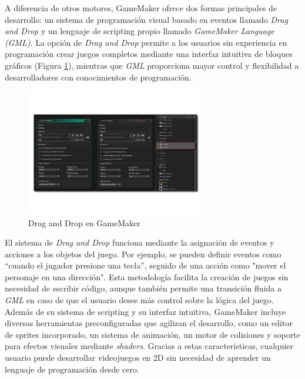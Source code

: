 A diferencia de otros motores, GameMaker ofrece dos formas principales de desarrollo: un sistema de programación visual basado en eventos llamado \textit{Drag and Drop} y un lenguaje de scripting propio llamado \textit{GameMaker Language (GML)}. La opción de \textit{Drag and Drop} permite a los usuarios sin experiencia en programación crear juegos completos mediante una interfaz intuitiva de bloques gráficos (Figura \ref{fig:GameMaker_Figure}), mientras que \textit{GML} proporciona mayor control y flexibilidad a desarrolladores con conocimientos de programación.\\
\begin{figure}[t]
	\centering
	\includegraphics[width = 0.7\textwidth]{Imagenes/GameMaker.pdf}
	\caption{Drag and Drop en GameMaker}
	\label{fig:GameMaker_Figure}
\end{figure}

El sistema de \textit{Drag and Drop} funciona mediante la asignación de eventos y acciones a los objetos del juego. Por ejemplo, se pueden definir eventos como ``cuando el jugador presione una tecla'', seguido de una acción como "mover el personaje en una dirección". Esta metodología facilita la creación de juegos sin necesidad de escribir código, aunque también permite una transición fluida a \textit{GML} en caso de que el usuario desee más control sobre la lógica del juego.\\


Además de su sistema de scripting y su interfaz intuitiva, GameMaker incluye diversas herramientas preconfiguradas que agilizan el desarrollo, como un editor de sprites incorporado, un sistema de animación, un motor de colisiones y soporte para efectos visuales mediante \textit{shaders}. Gracias a estas características, cualquier usuario puede desarrollar videojuegos en 2D sin necesidad de aprender un lenguaje de programación desde cero.\\

